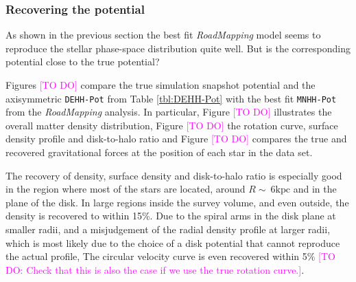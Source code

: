 \documentclass[iop,revtex4,numberedappendix,appendixfloats]{emulateapj}
\newcommand{\RM}{{\sl RoadMapping}}
\newcommand{\Wilma}[1]{\textcolor{Magenta}{#1}}
\begin{document}
\subsubsection{Recovering the potential} \label{sec:4kpc8Spiral_potential}

As shown in the previous section the best fit \RM{} model seems to reproduce the stellar phase-space distribution quite well. But is the corresponding potential close to the true potential? 

Figures \Wilma{[TO DO]} compare the true simulation snapshot potential and the axisymmetric \texttt{DEHH-Pot} from Table \ref{tbl:DEHH-Pot} with the best fit \texttt{MNHH-Pot} from the \RM{} analysis. In particular, Figure \Wilma{[TO DO]} illustrates the overall matter density distribution, Figure \Wilma{[TO DO]} the rotation curve, surface density profile and disk-to-halo ratio and Figure \Wilma{[TO DO]} compares the true and recovered gravitational forces at the position of each star in the data set.

The recovery of density, surface density and disk-to-halo ratio is especially good in the region where most of the stars are located, around $R\sim~6\text{kpc}$ and in the plane of the disk. In large regions inside the survey volume, and even outside, the density is recovered to within 15\%. Due to the spiral arms in the disk plane at smaller radii, and a misjudgement of the radial density profile at larger radii, which is most likely due to the choice of a disk potential that cannot reproduce the actual profile, The circular velocity curve is even recovered within 5\% \Wilma{[TO DO: Check that this is also the case if we use the true rotation curve.]}.
\end{document}
